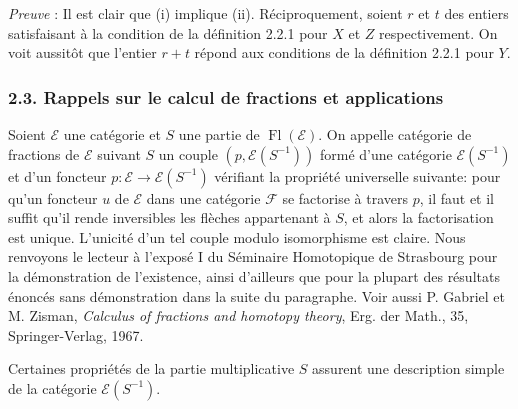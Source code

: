 \documentclass[11pt]{article}
\providecommand{\Fl}{\operatorname{Fl}}
\providecommand{\cE}{\mathcal E}
\providecommand{\cF}{\mathcal F}
\begin{document}
\emph{Preuve} : Il est clair que (i) implique (ii). Réciproquement, soient $r$ et $t$ des entiers satisfaisant à la condition de la définition 2.2.1 pour $X$ et $Z$ respectivement. On voit aussitôt que l'entier $r+t$ répond aux conditions de la définition 2.2.1 pour $Y$.

\subsubsection*{2.3. Rappels sur le calcul de fractions et applications}
Soient $\cE$ une catégorie et $S$ une partie de $\Fl(\cE)$. On appelle catégorie de fractions de $\cE$ suivant $S$ un couple $(p,\cE(S^{-1}))$ formé d'une catégorie $\cE(S^{-1})$ et d'un foncteur $p:\cE\to\cE(S^{-1})$ vérifiant la propriété universelle suivante: pour qu'un foncteur $u$ de $\cE$ dans une catégorie $\cF$ se factorise à travers $p$, il faut et il suffit qu'il rende inversibles les flèches appartenant à $S$, et alors la factorisation est unique. L'unicité d'un tel couple modulo isomorphisme est claire. Nous renvoyons le lecteur à l'exposé I du Séminaire Homotopique de Strasbourg pour la démonstration de l'existence, ainsi d'ailleurs que pour la plupart des résultats énoncés sans démonstration dans la suite du paragraphe. Voir aussi P. Gabriel et M. Zisman, \emph{Calculus of fractions and homotopy theory}, Erg. der Math., 35, Springer-Verlag, 1967.

Certaines propriétés de la partie multiplicative $S$ assurent une description simple de la catégorie $\cE(S^{-1})$.
\end{document}

